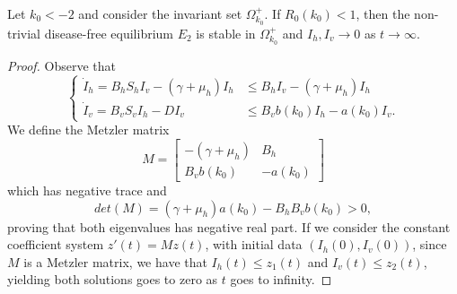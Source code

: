 \documentclass[10pt,a4paper]{amsart}
\begin{document}
\begin{prop}\label{Stability}
	Let $k_0 < -2$ and consider the invariant set $\Omega^+_{k_0}$. 
	If $R_0(k_0)<1$, then the non-trivial disease-free equilibrium $E_2$ is stable in $\Omega^+_{k_0}$ and $I_h,I_v \to 0$ as $t\to \infty$.
\end{prop}

\begin{proof}
Observe that
	$$
	\begin{cases}
			\dot{I}_h = B_h S_h I_v - (\gamma + \mu_h) I_h&\leq B_h I_v - (\gamma + \mu_h) I_h \\
			\dot{I}_v = B_v S_v I_h -  D I_v&\leq B_v b(k_0) I_h -a(k_0) I_v.
		\end{cases}
	$$
	We define the Metzler matrix
		\begin{equation}\label{matriz Metzler}
	M=
\begin{bmatrix}
-(\gamma + \mu_h) & B_h \\%
B_v b(k_0) & -a(k_0)
\end{bmatrix}
\end{equation}
which has negative trace and 
	$$det(M)= (\gamma + \mu_h)a(k_0) - B_h B_v  b(k_0) >0,
	$$
proving that both eigenvalues has negative real part. If we consider the constant coefficient system $z'(t)=Mz(t)$, with initial data $(I_h(0),I_v(0))$, since $M$ is a Metzler matrix, we have that $I_h(t)\le z_1(t)$ and $I_v(t)\le z_2(t)$, yielding 
both solutions goes to zero as $t$ goes to infinity.
\end{proof}
\end{document}
